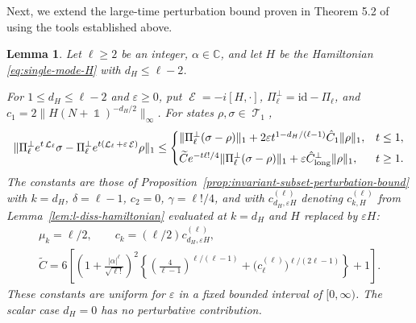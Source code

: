 \documentclass[11pt]{article}
\theoremstyle{myplain}
\newtheorem{lem}[lem]{Lemma}
\theoremstyle{mydefinition}
\theoremstyle{remark}
\DeclareMathOperator{\cE}{\mathcal{E}}
\DeclareMathOperator{\cL}{\mathcal{L}}
\DeclareMathOperator{\cT}{\mathcal{T}}
\DeclareMathOperator{\1}{\mathds{1}}
\begin{document}
        Next, we extend the large-time perturbation bound proven in Theorem 5.2 of \cite{Gondolf.2024} using the tools established above.

        \begin{lem}\label{lem:application-large-time-perturbation}
            Let $\ell \geq 2$ be an integer, $\alpha \in \mathbb{C}$, and let $H$ be the Hamiltonian \eqref{eq:single-mode-H} with $d_H \leq \ell - 2$.
            
            For $1 \leq d_H \leq \ell-2$ and $\varepsilon \geq 0$, put $\cE = -i[H,\cdot]$, $\Pi_\ell^\perp = \mathrm{id}-\Pi_\ell$, and $c_1 = 2\|H(N+\1)^{-d_H/2}\|_\infty$. For states $\rho,\sigma\in\cT_1$,
            \begin{equation*}
                \begin{aligned}
                    \|\Pi_\ell^\perp e^{t\cL_\ell}\sigma-
                    \Pi_\ell^\perp e^{t(\cL_\ell+\varepsilon\cE)}\rho\|_1
                    \leq\begin{cases}
                        \|\Pi_\ell^\perp(\sigma-\rho)\|_1+
                        2\varepsilon t^{1-d_H/(\ell-1)}\hat C_1\|\rho\|_1,&t\leq1,\\[4pt]
                        \widetilde C e^{-t\ell!/4}\|\Pi_\ell^\perp(\sigma-\rho)\|_1+
                        \varepsilon\hat C_{\rm long}^{\perp}\|\rho\|_1,&t\geq1.
                    \end{cases}
                \end{aligned}
            \end{equation*}
            The constants are those of Proposition~\ref{prop:invariant-subset-perturbation-bound} with $k=d_H$, $\delta=\ell-1$, $c_2=0$, $\gamma=\ell!/4$, and with $c_{d_H,\varepsilon H}^{(\ell)}$ denoting $c_{k,H}^{(\ell)}$ from Lemma~\ref{lem:l-diss-hamiltonian} evaluated at $k=d_H$ and $H$ replaced by $\varepsilon H$:
            \begin{equation*}
                \begin{gathered}
                    \mu_k=\ell/2,\qquad c_k=(\ell/2)c_{d_H,\varepsilon H}^{(\ell)},\\
                    \widetilde C=6\left[\left(1+\frac{|\alpha|^\ell}{\sqrt{\ell!}}\right)^2
                    \left\{\left(\frac4{\ell-1}\right)^{\ell/(\ell-1)}
                    +\bigl(c_\ell^{(\ell)}\bigr)^{\ell/(2\ell-1)}\right\}+1\right].
                \end{gathered}
            \end{equation*}
            These constants are uniform for $\varepsilon$ in a fixed bounded interval of $[0,\infty)$. The scalar case $d_H=0$ has no perturbative contribution.
            
        \end{lem}
\end{document}
